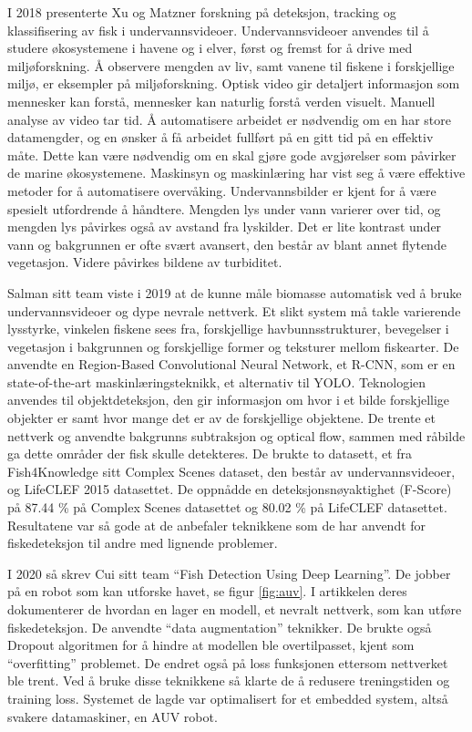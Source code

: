 I 2018 presenterte Xu og Matzner forskning på deteksjon, tracking og klassifisering av fisk i undervannsvideoer. Undervannsvideoer anvendes til å studere økosystemene i havene og i elver, først og fremst for å drive med miljøforskning. Å observere mengden av liv, samt vanene til fiskene i forskjellige miljø, er eksempler på miljøforskning. Optisk video gir detaljert informasjon som mennesker kan forstå, mennesker kan naturlig forstå verden visuelt. Manuell analyse av video tar tid. Å automatisere arbeidet er nødvendig om en har store datamengder, og en ønsker å få arbeidet fullført på en gitt tid på en effektiv måte. Dette kan være nødvendig om en skal gjøre gode avgjørelser som påvirker de marine økosystemene. Maskinsyn og maskinlæring har vist seg å være effektive metoder for å automatisere overvåking. Undervannsbilder er kjent for å være spesielt utfordrende å håndtere. Mengden lys under vann varierer over tid, og mengden lys påvirkes også av avstand fra lyskilder. Det er lite kontrast under vann og bakgrunnen er ofte svært avansert, den består av blant annet flytende vegetasjon. Videre påvirkes bildene av turbiditet. \cite{Xu og Matzner 2018}

Salman sitt team viste i 2019 at de kunne måle biomasse automatisk ved å bruke undervannsvideoer og dype nevrale nettverk.  Et slikt system må takle varierende lysstyrke, vinkelen fiskene sees fra, forskjellige havbunnsstrukturer, bevegelser i vegetasjon i bakgrunnen og forskjellige former og teksturer mellom fiskearter. De anvendte en Region-Based Convolutional Neural Network, et R-CNN, som er en state-of-the-art maskinlæringsteknikk, et alternativ til YOLO. Teknologien anvendes til objektdeteksjon, den gir informasjon om hvor i et bilde forskjellige objekter er samt hvor mange det er av de forskjellige objektene. De trente et nettverk og anvendte bakgrunns subtraksjon og optical flow, sammen med råbilde ga dette områder der fisk skulle detekteres. De brukte to datasett, et fra Fish4Knowledge sitt Complex Scenes dataset, den består av undervannsvideoer, og LifeCLEF 2015 datasettet. De oppnådde en deteksjonsnøyaktighet (F-Score) på 87.44 \% på Complex Scenes datasettet og 80.02 \% på LifeCLEF datasettet. Resultatene var så gode at de anbefaler teknikkene som de har anvendt for fiskedeteksjon til andre med lignende problemer. \cite{Salman m.fl. 2019}

I 2020 så skrev Cui sitt team ``Fish Detection Using Deep Learning''. De jobber på en robot som kan utforske havet, se figur \ref{fig:auv}. I artikkelen deres dokumenterer de hvordan en lager en modell, et nevralt nettverk, som kan utføre fiskedeteksjon. De anvendte ``data augmentation'' teknikker. De brukte også Dropout algoritmen for å hindre at modellen ble overtilpasset, kjent som ``overfitting'' problemet. De endret også på loss funksjonen ettersom nettverket ble trent. Ved å bruke disse teknikkene så klarte de å redusere treningstiden og training loss. Systemet de lagde var optimalisert for et embedded system, altså svakere datamaskiner, en AUV robot. \cite{Cui m.fl. 2020}


